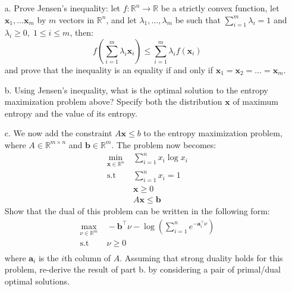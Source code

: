 \documentclass[11pt]{article}
\theoremstyle{remark}
\newcommand{\R}{\mathbb{R}}                     %
\newcommand{\bx}{\mathbf{x}}
\newcommand{\bb}{\mathbf{b}}
\newcommand{\ba}{\mathbf{a}}
\begin{document}
\begin{itemize}
    \item[a.] Prove Jensen's inequality: let $f:\R^n\to\R$ be a strictly convex
        function, let $\bx_1,\dots\bx_m$ by $m$ vectors in $\R^n$, and let
        $\lambda_1,\dots,\lambda_m$ be such that $\sum_{i=1}^m\lambda_i=1$ and
        $\lambda_i\geq 0,\;1\leq i\leq m$, then:
        \begin{displaymath}
            f\left(\sum_{i=1}^m\lambda_i\bx_i\right)
            \leq \sum_{i=1}^m\lambda_if(\bx_i)
        \end{displaymath}
        and prove that the inequality is an equality if and only if
        $\bx_1=\bx_2=\dots=\bx_m$.
    \item[b.] Using Jensen's inequality, what is the optimal solution to the
        entropy maximization problem above? Specify both the distribution $\bx$
        of maximum entropy and the value of its entropy.
    \item[c.] We now add the constraint $A\bx\leq b$ to the entropy
        maximization problem, where $A\in\R^{m\times n}$ and $\bb\in\R^m$. The
        problem now becomes:
\begin{displaymath}
    \begin{aligned}
        \min_{\bx\in\R^n}&\; \sum_{i=1}^nx_i\log x_i\\
        \text{s.t} &\; \sum_{i=1}^n x_i = 1\\
                   &\; \bx\geq 0\\
                   &\; A\bx\leq \bb
    \end{aligned}
\end{displaymath}
Show that the dual of this problem can be written in the following form:
\begin{displaymath}
    \begin{aligned}
        \max_{\nu\in\R^m}&\; -\bb^\intercal \nu
        -\log\left(\sum_{i=1}^ne^{-\ba_i^\intercal \nu}\right)\\
        \text{s.t} &\; \nu\geq 0\\
    \end{aligned}
\end{displaymath}
where $\ba_i$ is the $i$th column of $A$. Assuming that strong duality holds
for this problem, re-derive the result of part b. by considering a pair of
primal/dual optimal solutions.
\end{itemize}
\end{document}
